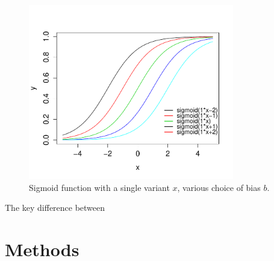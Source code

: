 \documentclass[
10pt, %
a4paper, %
oneside, %
headinclude,footinclude, %
BCOR5mm, %
]{scrartcl}
\begin{document}
\begin{figure}
\centering
\includegraphics[width=0.8\textwidth]{Figures/sigmoid2.pdf}
\caption{Sigmoid function with a single variant $x$, various choice of bias $b$.}
\label{fig:sigmoid2}
\end{figure}


The key difference between 

\section{Methods}




\renewcommand{\refname}{\spacedlowsmallcaps{References}} %




\end{document}
